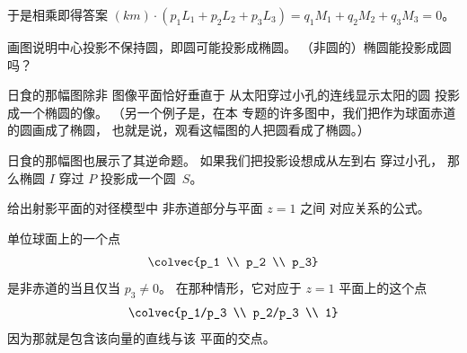 \begin{exercises}
\begin{answer}
\begin{equation*}
      \end{equation*}
      于是相乘即得答案
      $(km)\cdot (p_1L_1+p_2L_2+p_3L_3)=q_1M_1+q_2M_2+q_3M_3=0$。
    \end{answer}
  \item 
    画图说明中心投影不保持圆，即圆可能投影成椭圆。
    （非圆的）椭圆能投影成圆吗？
    \begin{answer}
      日食的那幅图\Dash 除非
      图像平面恰好垂直于
      从太阳穿过小孔的连线\Dash 显示太阳的圆
      投影成一个椭圆的像。
      （另一个例子是，在本
      专题的许多图中，我们把作为球面赤道的圆画成了椭圆，
      也就是说，观看这幅图的人把圆看成了椭圆。）
      
      日食的那幅图也展示了其逆命题。
      如果我们把投影设想成从左到右
      穿过小孔，
      那么椭圆 $I$ 穿过 $P$ 投影成一个圆~$S$。
    \end{answer}
  \item \label{exer:CorrProjPlaneEucPl} 
    给出射影平面的对径模型中
    非赤道部分与平面 $z=1$ 之间
    对应关系的公式。
    \begin{answer}
      单位球面上的一个点
      \begin{equation*}
        \colvec{p_1 \\ p_2 \\ p_3} 
      \end{equation*}
      是非赤道的当且仅当 $p_3\neq 0$。
      在那种情形，它对应于 $z=1$ 平面上的这个点
      \begin{equation*}
        \colvec{p_1/p_3 \\ p_2/p_3  \\ 1}
      \end{equation*}
      因为那就是包含该向量的直线与该
      平面的交点。
    \end{answer}

\end{exercises}
